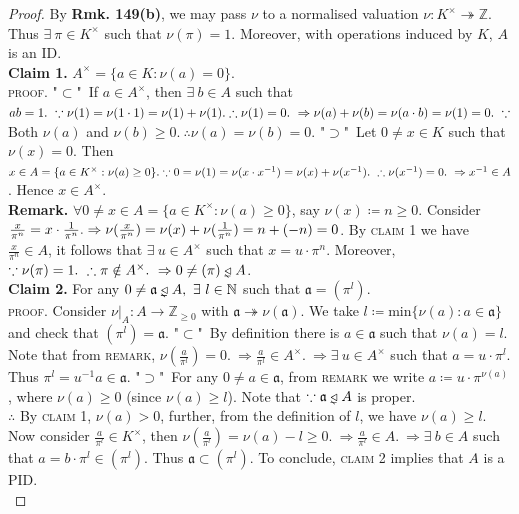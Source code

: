 \documentclass[12pt,a4paper,footinclude=true,headinclude=true]{scrbook} %
\newcommand{\trianglerightneq}{\mathrel{\ooalign{\raisebox{-0.5ex}{\reflectbox{\rotatebox{90}{$\nshortmid$}}}\cr$\triangleright$\cr}\mkern-3mu}}
\newcommand{\triangleleftneq}{\mathrel{\reflectbox{$\trianglerightneq$}}}
\begin{document}
\begin{proof}
    By \textbf{Rmk. 149(b)}, we may pass $\nu$ to a normalised valuation $\nu:K^\times\twoheadrightarrow\mathbb{Z}$. Thus $\exists\ \pi\in K^\times$ such that $\nu(\pi)=1$. Moreover, with operations induced by $K$, $A$ is an ID.\\
    \textbf{Claim 1.} $A^\times=\{a\in K:\nu(a)=0\}$.\\ \textsc{proof.}
    "$\subset$"\ If $a\in  A^\times$, then $\exists\ b\in A$ such that $ab=1.\ \because \nu(1)=\nu(1\cdot1)=\nu(1)+\nu(1).\\ \therefore \nu(1)=0.\ \Rightarrow \nu(a)+\nu(b)=\nu(a\cdot b)=\nu(1)=0.\ \because$ Both $\nu(a)$ and $\nu(b)\geq0.\ \therefore \nu(a)=\nu(b)=0$. "$\supset$"\ Let $0\neq x\in K$ such that $\nu(x)=0$. Then $x\in A=\{a\in K^\times:\nu(a)\geq0\}.\\ \because 0=\nu(1)=\nu(x\cdot x^{-1})=\nu(x)+\nu(x^{-1}). \ \therefore \nu(x^{-1})=0.\ \Rightarrow x^{-1}\in A$. Hence $x\in A^\times$.\\
    \textbf{Remark.} $\forall0\neq x\in A=\{a\in K^\times:\nu(a)\geq0\}$, say $\nu(x)\coloneqq n\geq0$. Consider $\frac{x}{\pi^n}=x\cdot\frac{1}{\pi^n}.\\ \Rightarrow \nu(\frac{x}{\pi^n})=\nu(x)+\nu(\frac{1}{\pi^n})=n+(-n)=0$. By \textsc{claim 1} we have $\frac{x}{\pi^n}\in A$, it follows that $\exists\ u\in A^\times$ such that $x=u\cdot\pi^n$. Moreover, $\because \nu(\pi)=1.\ \therefore\pi\notin A^\times.\ \Rightarrow 0\neq(\pi) \triangleleftneq A$.\\ 
    \textbf{Claim 2.} For any $0\neq\mathfrak{a}\triangleleftneq A,\ \exists\ l\in\mathbb{N}$ such that $\mathfrak{a}=(\pi^l)$.\\ \textsc{proof.}
    Consider $\nu|_A:A\to\mathbb{Z}_{\geq0}$ with $\mathfrak{a}\twoheadrightarrow \nu(\mathfrak{a})$. We take $l\coloneqq\mathrm{min}\{\nu(a):a\in\mathfrak{a}\}$ and check that $(\pi^l)=\mathfrak{a}$. "$\subset$"\ By definition there is $a\in\mathfrak{a}$ such that $\nu(a)=l$. Note that from \textsc{remark}, $\nu(\frac{a}{\pi^l})=0.\ \Rightarrow \frac{a}{\pi^l}\in A^\times.\ \Rightarrow \exists\ u\in A^\times$ such that $a=u\cdot\pi^l$. Thus $\pi^l=u^{-1}a\in\mathfrak{a}$. "$\supset$"\ For any $0\neq a\in\mathfrak{a}$, from \textsc{remark} we write $a\coloneqq u\cdot\pi^{\nu(a)}$, where $\nu(a)\geq0$ (since $\nu(a)\geq l$). Note that $\because \mathfrak{a}\triangleleftneq A$ is proper.\\ $\therefore$ By \textsc{claim 1}, $\nu(a)>0$, further, from the definition of $l$, we have $\nu(a)\geq l$. Now consider $\frac{a}{\pi^l}\in K^\times$, then $\nu(\frac{a}{\pi^l})=\nu(a)-l\geq0.\ \Rightarrow \frac{a}{\pi^l}\in A.\ \Rightarrow \exists\ b\in A$ such that $a=b\cdot\pi^l\in(\pi^l)$. Thus $\mathfrak{a}\subset(\pi^l)$. To conclude, \textsc{claim 2} implies that $A$ is a PID.\\

\end{proof}
\end{document}
